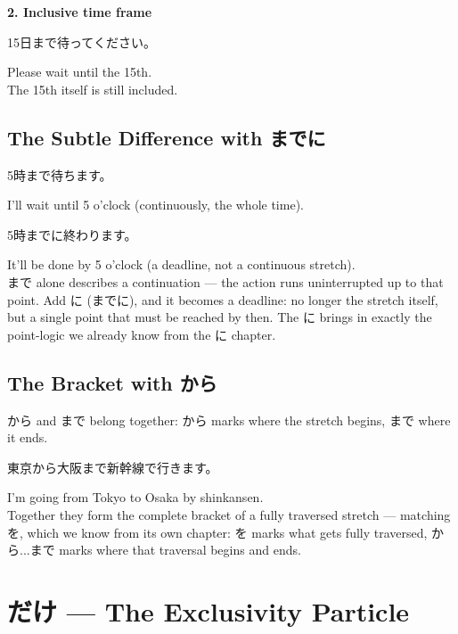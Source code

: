 \documentclass[12pt]{book}
\begin{document}
\textbf{2. Inclusive time frame}
\par\quad 15日まで待ってください。\\
\par\quad Please wait until the 15th.\\

The 15th itself is still included.

\section*{The Subtle Difference with までに}

\par\quad 5時まで待ちます。\\
\par\quad I'll wait until 5 o'clock (continuously, the whole time).\\

\par\quad 5時までに終わります。\\
\par\quad It'll be done by 5 o'clock (a deadline, not a continuous stretch).\\

まで alone describes a continuation — the action runs uninterrupted up to that point. Add に (までに), and it becomes a deadline: no longer the stretch itself, but a single point that must be reached by then. The に brings in exactly the point-logic we already know from the に chapter.

\section*{The Bracket with から}

から and まで belong together: から marks where the stretch begins, まで where it ends.

\par\quad 東京から大阪まで新幹線で行きます。\\
\par\quad I'm going from Tokyo to Osaka by shinkansen.\\

Together they form the complete bracket of a fully traversed stretch — matching を, which we know from its own chapter: を marks what gets fully traversed, から...まで marks where that traversal begins and ends.


\chapter{だけ — The Exclusivity Particle}
\end{document}
